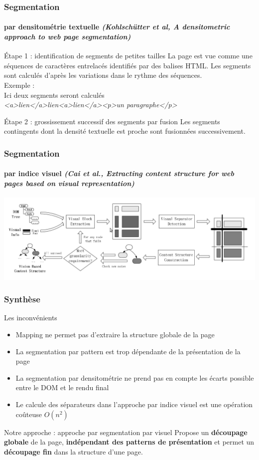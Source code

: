 \documentclass[]{beamer}
\begin{document}
\begin{frame}
\frametitle{Segmentation}
\framesubtitle{par densitométrie textuelle \textit{(Kohlsch{\"u}tter et al, A densitometric approach to web page segmentation)}}

\begin{block}{Étape 1 : identification de segments de petites tailles}	
La page est vue comme une séquences de caractères entrelacés identifiés par des balises HTML. Les segments sont calculés d'après les variations dans le rythme des séquences.\\
Exemple : \\
Ici deux segments seront calculés \\
\textit{<a>lien</a>lien<a>lien</a><p>un paragraphe</p>}
\end{block}

\begin{block}{Étape 2 : grossissement successif des segments par fusion}
Les segments contingents dont la densité textuelle est proche sont fusionnées successivement.
\end{block}

\end{frame}

\begin{frame}
\frametitle{Segmentation}
\framesubtitle{par indice visuel \textit{(Cai et al., Extracting content structure for web pages based on visual representation)}}
\includegraphics[scale=0.3]{img/segmentation-vips.png}
\end{frame}

\begin{frame}
\frametitle{Synthèse}
\begin{block}{Les inconvénients}
	\begin{itemize}
		\item Mapping ne permet pas d'extraire la structure globale de la page
		\item La segmentation par pattern est trop dépendante de la présentation de la page
		\item La segmentation par densitométrie ne prend pas en compte les écarts possible entre le DOM et le rendu final
		\item Le calcule des séparateurs dans l'approche par indice visuel est une opération coûteuse $O(n^2)$
	\end{itemize}
\end{block}
\begin{block}{Notre approche : approche par segmentation par visuel}
Propose un \textbf{découpage globale} de la page, \textbf{indépendant des patterns de présentation} et permet un \textbf{découpage fin} dans la structure d'une page.
\end{block}
\end{frame}
\end{document}
